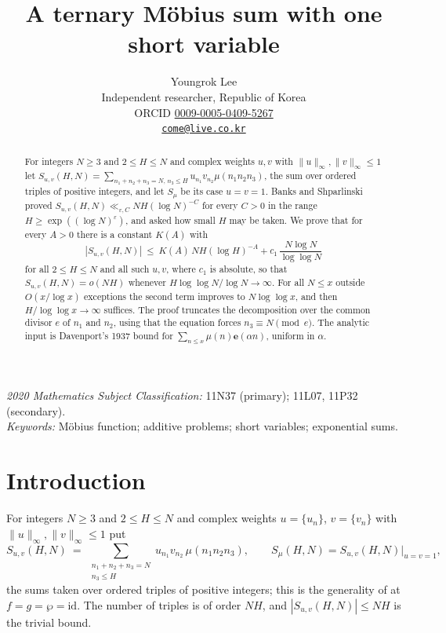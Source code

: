 \documentclass[11pt,a4paper]{article}
\title{A ternary M\"obius sum with one short variable}
\author{Youngrok Lee\\
\small Independent researcher, Republic of Korea\\ \small ORCID \href{https://orcid.org/0009-0005-0409-5267}{0009-0005-0409-5267}\\
\small \href{mailto:come@live.co.kr}{\texttt{come@live.co.kr}}}
\date{}
\theoremstyle{plain}
\theoremstyle{remark}
\newcommand{\eps}{\varepsilon}
\newcommand{\e}[1]{\mathbf{e}\!\left(#1\right)}
\newcommand{\Smu}{S_{\mu}}
\newcommand{\Suv}{S_{u,v}}
\begin{document}
\maketitle

\begin{abstract}
For integers $N\ge 3$ and $2\le H\le N$ and complex weights $u,v$ with
$\|u\|_\infty,\|v\|_\infty\le1$ let
$\Suv(H,N)=\sum_{n_1+n_2+n_3=N,\,n_3\le H}u_{n_1}v_{n_2}\mu(n_1n_2n_3)$, the sum over ordered triples
of positive integers, and let $\Smu$ be its case $u=v=1$. Banks and Shparlinski proved
$\Suv(H,N)\ll_{\eps,C}NH(\log N)^{-C}$ for every $C>0$ in the range $H\ge\exp((\log N)^{\eps})$, and
asked how small $H$ may be taken. We prove that for every $A>0$ there is a constant $K(A)$ with
\[
  |\Suv(H,N)|\ \le\ K(A)\,NH(\log H)^{-A}+c_1\,\frac{N\log N}{\log\log N}
\]
for all $2\le H\le N$ and all such $u,v$, where $c_1$ is absolute, so that $\Suv(H,N)=o(NH)$ whenever
$H\log\log N/\log N\to\infty$. For all $N\le x$ outside $O(x/\log x)$ exceptions the second term
improves to $N\log\log x$, and then $H/\log\log x\to\infty$ suffices. The proof truncates the
decomposition over the common divisor $e$ of $n_1$ and $n_2$, using that the equation forces
$n_3\equiv N\pmod e$. The analytic input is Davenport's 1937 bound for
$\sum_{n\le x}\mu(n)\e{\alpha n}$, uniform in $\alpha$.
\end{abstract}

\noindent\textit{2020 Mathematics Subject Classification:} 11N37 (primary); 11L07, 11P32 (secondary).\\
\textit{Keywords:} M\"obius function; additive problems; short variables; exponential sums.

\section{Introduction}\label{sec:intro}

For integers $N\ge 3$ and $2\le H\le N$ and complex weights $u=\{u_n\}$, $v=\{v_n\}$ with
$\|u\|_\infty,\|v\|_\infty\le1$ put
\begin{equation}\label{eq:S}
  \Suv(H,N)\ =\ \sum_{\substack{n_1+n_2+n_3=N\\ n_3\le H}}u_{n_1}v_{n_2}\,\mu(n_1n_2n_3),
  \qquad \Smu(H,N)=\Suv(H,N)\big|_{u=v=1},
\end{equation}
the sums taken over ordered triples of positive integers; this is the generality of
\cite[Thm.~2.1]{BS} at $f=g=\wp=\mathrm{id}$. The number of triples is of order $NH$, and
$|\Suv(H,N)|\le NH$ is the trivial bound.
\end{document}
